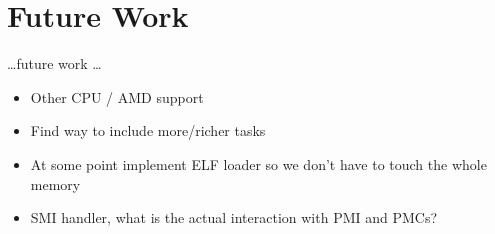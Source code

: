 \chapter{Future Work}
\label{sec:futurework}

\ldots future work \ldots

\begin{itemize}
    \item Other CPU / AMD support
    \item Find way to include more/richer tasks
    \item At some point implement ELF loader so we don't have to touch the whole memory
    \item SMI handler, what is the actual interaction with PMI and PMCs?
\end{itemize}
\cleardoublepage
